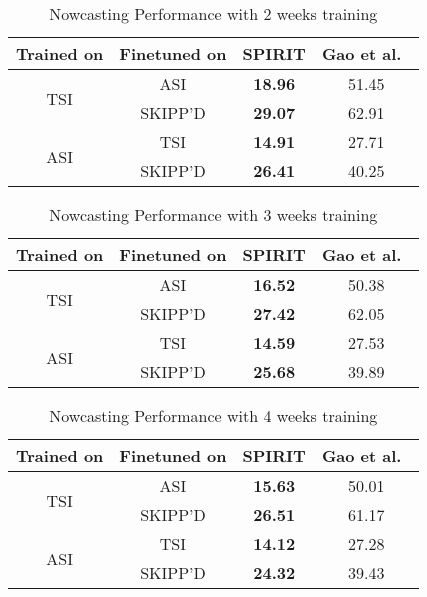 \begin{table}[h]
  \caption{
  Nowcasting Performance with 2 weeks training
  }
  \label{tab:twoweek_nowcast}
  \centering
  \renewcommand{\arraystretch}{1.2}
  \begin{tabular}{@{}c c c c@{}}
    \hline
    \textbf{Trained on} & \textbf{Finetuned on} & \textbf{SPIRIT} & \textbf{Gao et al.~\cite{wacv2022}} \\
    \hline
    \multirow{2}{*}{TSI} & ASI & \textbf{18.96}  & 51.45 \\
                          & SKIPP'D & \textbf{29.07}  & 62.91 \\
    \cline{1-4}
    \multirow{2}{*}{ASI} & TSI & \textbf{14.91}  & 27.71 \\
                          & SKIPP'D & \textbf{26.41}  & 40.25 \\
    \hline
  \end{tabular}
\end{table}

\begin{table}[h]
  \caption{
  Nowcasting Performance with 3 weeks training
  }
  \label{tab:threeweek_nowcast}
  \centering
  \renewcommand{\arraystretch}{1.2}
  \begin{tabular}{@{}c c c c@{}}
    \hline
    \textbf{Trained on} & \textbf{Finetuned on} & \textbf{SPIRIT} & \textbf{Gao et al.~\cite{wacv2022}} \\
    \hline
    \multirow{2}{*}{TSI} & ASI & \textbf{16.52}  & 50.38 \\
                          & SKIPP'D & \textbf{27.42}  & 62.05 \\
    \cline{1-4}
    \multirow{2}{*}{ASI} & TSI & \textbf{14.59}  & 27.53 \\
                          & SKIPP'D & \textbf{25.68}  & 39.89 \\
    \hline
  \end{tabular}
\end{table}

\begin{table}[h]
  \caption{
  Nowcasting Performance with 4 weeks training
  }
  \label{tab:fourweek_nowcast}
  \centering
  \renewcommand{\arraystretch}{1.2}
  \begin{tabular}{@{}c c c c@{}}
    \hline
    \textbf{Trained on} & \textbf{Finetuned on} & \textbf{SPIRIT} & \textbf{Gao et al.~\cite{wacv2022}} \\
    \hline
    \multirow{2}{*}{TSI} & ASI & \textbf{15.63}  & 50.01 \\
                          & SKIPP'D & \textbf{26.51}  & 61.17 \\
    \cline{1-4}
    \multirow{2}{*}{ASI} & TSI & \textbf{14.12}  & 27.28 \\
                          & SKIPP'D & \textbf{24.32}  & 39.43 \\
    \hline
  \end{tabular}
\end{table}


